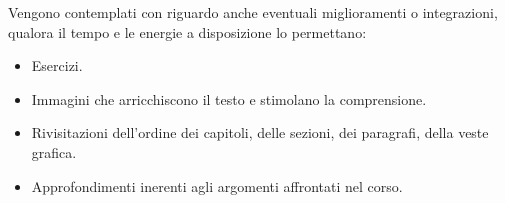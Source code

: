 Vengono contemplati con riguardo anche eventuali miglioramenti o integrazioni,
qualora il tempo e le energie a disposizione lo permettano:

\begin{itemize}
    \item Esercizi.
    \item Immagini che arricchiscono il testo e stimolano la comprensione.
    \item Rivisitazioni dell'ordine dei capitoli, delle sezioni, dei paragrafi, della veste grafica.
    \item Approfondimenti inerenti agli argomenti affrontati nel corso.
\end{itemize}